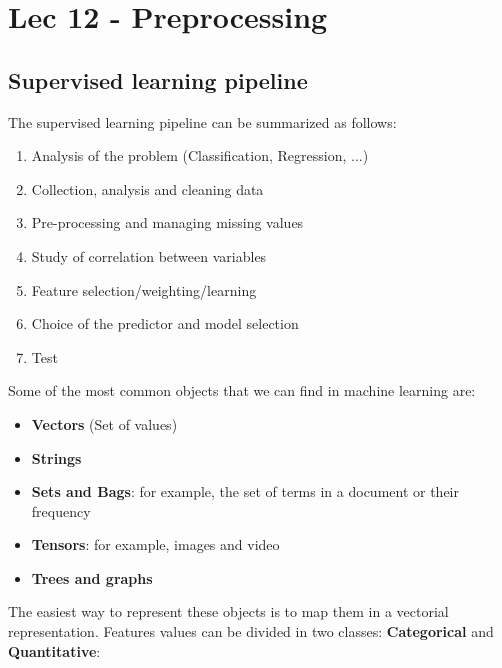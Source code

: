 \chapter{Lec 12 - Preprocessing}

\section{Supervised learning pipeline}
The supervised learning pipeline can be summarized as follows:
\begin{enumerate}
    \item Analysis of the problem (Classification, Regression, ...)

    \item Collection, analysis and cleaning data

    \item Pre-processing and managing missing values

    \item Study of correlation between variables 

    \item Feature selection/weighting/learning

    \item Choice of the predictor and model selection

    \item Test
\end{enumerate}
Some of the most common objects that we can find in machine learning are:
\begin{itemize}
    \item \textbf{Vectors} (Set of values)
    \item \textbf{Strings}
    \item \textbf{Sets and Bags}: for example, the set of terms in a document or their frequency
    \item \textbf{Tensors}: for example, images and video
    \item \textbf{Trees and graphs}
\end{itemize}
The easiest way to represent these objects is to map them in a vectorial representation.\newline\newline
Features values can be divided in two classes: \textbf{Categorical} and \textbf{Quantitative}:

